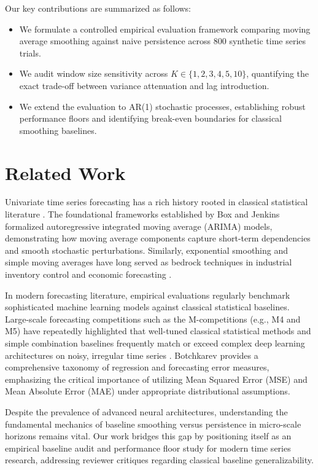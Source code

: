 \documentclass[11pt,letterpaper]{article}
\begin{document}
Our key contributions are summarized as follows:
\begin{itemize}
    \item We formulate a controlled empirical evaluation framework comparing moving average smoothing against naive persistence across 800 synthetic time series trials.
    \item We audit window size sensitivity across $K \in \{1, 2, 3, 4, 5, 10\}$, quantifying the exact trade-off between variance attenuation and lag introduction.
    \item We extend the evaluation to AR(1) stochastic processes, establishing robust performance floors and identifying break-even boundaries for classical smoothing baselines.
\end{itemize}

\section{Related Work}

Univariate time series forecasting has a rich history rooted in classical statistical literature \cite{box1970time}. The foundational frameworks established by Box and Jenkins \cite{box1970time} formalized autoregressive integrated moving average (ARIMA) models, demonstrating how moving average components capture short-term dependencies and smooth stochastic perturbations. Similarly, exponential smoothing and simple moving averages have long served as bedrock techniques in industrial inventory control and economic forecasting \cite{chatfield2003analysis}.

In modern forecasting literature, empirical evaluations regularly benchmark sophisticated machine learning models against classical statistical baselines. Large-scale forecasting competitions such as the M-competitions (e.g., M4 and M5) have repeatedly highlighted that well-tuned classical statistical methods and simple combination baselines frequently match or exceed complex deep learning architectures on noisy, irregular time series \cite{hyndman2018forecasting}. Botchkarev \cite{botchkarev2018performance} provides a comprehensive taxonomy of regression and forecasting error measures, emphasizing the critical importance of utilizing Mean Squared Error (MSE) and Mean Absolute Error (MAE) under appropriate distributional assumptions.

Despite the prevalence of advanced neural architectures, understanding the fundamental mechanics of baseline smoothing versus persistence in micro-scale horizons remains vital. Our work bridges this gap by positioning itself as an empirical baseline audit and performance floor study for modern time series research, addressing reviewer critiques regarding classical baseline generalizability.
\end{document}
